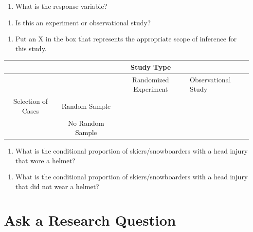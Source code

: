 \documentclass[
]{report}
\providecommand{\tightlist}{%
  \setlength{\itemsep}{0pt}\setlength{\parskip}{0pt}}
\begin{document}
\vspace{0.5in}

\begin{enumerate}
\def\labelenumi{\arabic{enumi}.}
\setcounter{enumi}{1}
\tightlist
\item
  What is the response variable?
\end{enumerate}

\vspace{0.5in}

\begin{enumerate}
\def\labelenumi{\arabic{enumi}.}
\setcounter{enumi}{2}
\tightlist
\item
  Is this an experiment or observational study?
\end{enumerate}

\vspace{0.5in}

\begin{enumerate}
\def\labelenumi{\arabic{enumi}.}
\setcounter{enumi}{3}
\tightlist
\item
  Put an X in the box that represents the appropriate scope of inference for this study.
\end{enumerate}

\begin{longtable}[]{@{}cccl@{}}
\toprule
& & Study Type &\tabularnewline
\midrule
\endhead
& & Randomized Experiment & Observational Study\tabularnewline
Selection of Cases & Random Sample & &\tabularnewline
& No Random Sample & &\tabularnewline
\bottomrule
\end{longtable}

\begin{enumerate}
\def\labelenumi{\arabic{enumi}.}
\setcounter{enumi}{4}
\tightlist
\item
  What is the conditional proportion of skiers/snowboarders with a head injury that wore a helmet?
\end{enumerate}

\vspace{1in}

\begin{enumerate}
\def\labelenumi{\arabic{enumi}.}
\setcounter{enumi}{5}
\tightlist
\item
  What is the conditional proportion of skiers/snowboarders with a head injury that did not wear a helmet?
\end{enumerate}

\vspace{1in}

\hypertarget{ask-a-research-question}{%
\section{Ask a Research Question}\label{ask-a-research-question}}
\end{document}
